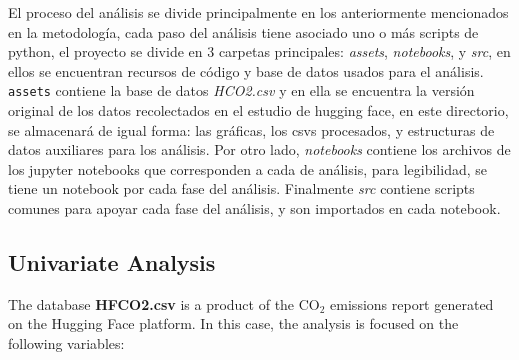 \documentclass[journal]{IEEEtran}
\begin{document}
	\label{sec:results}
	El proceso del análisis se divide principalmente en los anteriormente mencionados en la metodología, cada paso del análisis tiene asociado uno o más scripts de python, el proyecto se divide en 3 carpetas principales: \textit{assets}, \textit{notebooks},  y \textit{src}, en ellos se encuentran recursos de código y base de datos usados para el análisis. \texttt{assets} contiene la base de datos \textit{HCO2.csv} y en ella se encuentra la versión original de los datos recolectados en el estudio de hugging face\cite{exploring_carbon_footprint}, en este directorio, se almacenará de igual forma: las gráficas, los csvs procesados, y estructuras de datos auxiliares para los análisis. Por otro lado, \textit{notebooks} contiene los archivos de los jupyter notebooks que corresponden a cada de análisis, para legibilidad, se tiene un notebook por cada fase del análisis. Finalmente  \textit{src} contiene scripts comunes para apoyar cada fase del análisis, y son importados en cada notebook.

	 \subsection{Univariate Analysis}
	 \label{ssec:unianal}
	 The database \textbf{HFCO2.csv} is a product of the $\text{CO}_2$ emissions report generated on the Hugging Face platform. In this case, the analysis is focused on the following variables:
\end{document}
